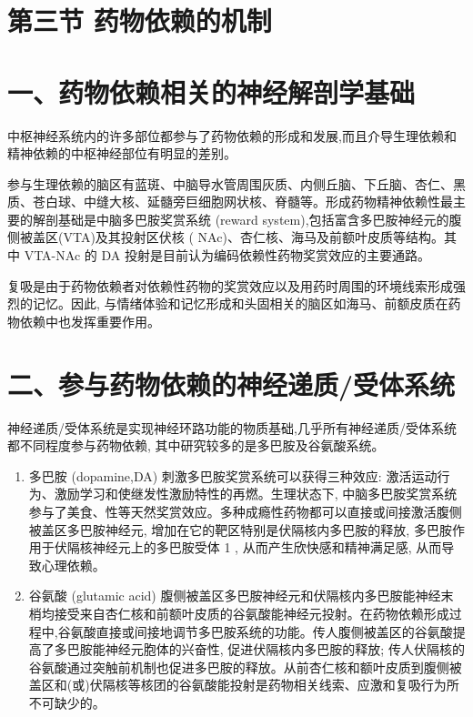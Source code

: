 \documentclass[10pt]{article}
\begin{document}
\section*{第三节 药物依赖的机制}
\section*{一、药物依赖相关的神经解剖学基础}
中枢神经系统内的许多部位都参与了药物依赖的形成和发展,而且介导生理依赖和精神依赖的中枢神经部位有明显的差别。

参与生理依赖的脑区有蓝斑、中脑导水管周围灰质、内侧丘脑、下丘脑、杏仁、黑质、苍白球、中缝大核、延髓旁巨细胞网状核、脊髓等。形成药物精神依赖性最主要的解剖基础是中脑多巴胺奖赏系统 (reward system),包括富含多巴胺神经元的腹侧被盖区(VTA)及其投射区伏核 ( NAc)、杏仁核、海马及前额叶皮质等结构。其中 VTA-NAc 的 DA 投射是目前认为编码依赖性药物奖赏效应的主要通路。

复吸是由于药物依赖者对依赖性药物的奖赏效应以及用药时周围的环境线索形成强烈的记忆。因此, 与情绪体验和记忆形成和头固相关的脑区如海马、前额皮质在药物依赖中也发挥重要作用。

\section*{二、参与药物依赖的神经递质/受体系统}
神经递质/受体系统是实现神经环路功能的物质基础,几乎所有神经递质/受体系统都不同程度参与药物依赖, 其中研究较多的是多巴胺及谷氨酸系统。

\begin{enumerate}
  \item 多巴胺 (dopamine,DA) 刺激多巴胺奖赏系统可以获得三种效应: 激活运动行为、激励学习和使继发性激励特性的再燃。生理状态下, 中脑多巴胺奖赏系统参与了美食、性等天然奖赏效应。多种成瘾性药物都可以直接或间接激活腹侧被盖区多巴胺神经元, 增加在它的靶区特别是伏隔核内多巴胺的释放, 多巴胺作用于伏隔核神经元上的多巴胺受体 1 , 从而产生欣快感和精神满足感, 从而导致心理依赖。

  \item 谷氨酸 (glutamic acid) 腹侧被盖区多巴胺神经元和伏隔核内多巴胺能神经末梢均接受来自杏仁核和前额叶皮质的谷氨酸能神经元投射。在药物依赖形成过程中,谷氨酸直接或间接地调节多巴胺系统的功能。传人腹侧被盖区的谷氨酸提高了多巴胺能神经元胞体的兴奋性, 促进伏隔核内多巴胺的释放; 传人伏隔核的谷氨酸通过突触前机制也促进多巴胺的释放。从前杏仁核和额叶皮质到腹侧被盖区和(或)伏隔核等核团的谷氨酸能投射是药物相关线索、应激和复吸行为所不可缺少的。

\end{enumerate}
\end{document}
